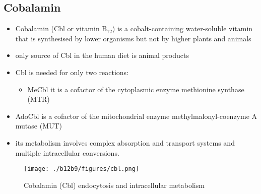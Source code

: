 \documentclass{scrartcl}
\begin{document}
\subsection{Cobalamin}
\label{sec:orgf44dfb7}
\begin{itemize}
\item Cobalamin (Cbl or vitamin B\(_{\text{12}}\)) is a cobalt-containing
water-soluble vitamin that is synthesised by lower organisms but not
by higher plants and animals
\item only source of Cbl in the human diet is animal products
\item Cbl is needed for only two reactions:
\begin{itemize}
\item MeCbl it is a cofactor of the cytoplasmic enzyme methionine synthase (MTR)
\end{itemize}
\end{itemize}
\begin{itemize}
\item AdoCbl is a cofactor of the mitochondrial enzyme methylmalonyl-coenzyme A mutase (MUT)
\end{itemize}
\begin{itemize}
\item its metabolism involves complex absorption and transport systems and
multiple intracellular conversions.
\end{itemize}


\begin{figure}[htbp]
\centering
\texttt{[image: ./b12b9/figures/cbl.png]}
\caption{\label{fig:org6045958}
Cobalamin (Cbl) endocytosis and intracellular metabolism}
\end{figure}
\end{document}
